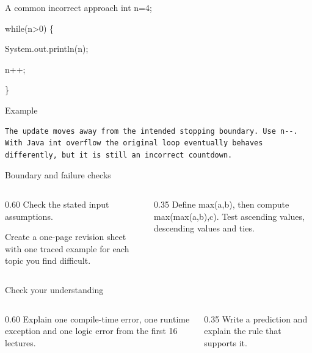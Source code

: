 \documentclass[10pt,aspectratio=169]{beamer}
\begin{document}
\begin{frame}[fragile,t]{A common incorrect approach}
int n=4;\par while(n\textgreater{}0) \{\par   System.out.println(n);\par   n++;\par \}
\vspace{1mm}\begin{block}{Example}
\begin{lstlisting}
The update moves away from the intended stopping boundary. Use n--. With Java int overflow the original loop eventually behaves differently, but it is still an incorrect countdown.
\end{lstlisting}
\end{block}
\end{frame}

\begin{frame}[fragile,t]{Boundary and failure checks}
\begin{columns}[T,onlytextwidth]\begin{column}{0.60\textwidth}
Check the stated input assumptions.

Create a one-page revision sheet with one traced example for each topic you find difficult.
\end{column}\begin{column}{0.35\textwidth}\small
Define max(a,b), then compute max(max(a,b),c). Test ascending values, descending values and ties.
\end{column}\end{columns}
\end{frame}

\begin{frame}[fragile,t]{Check your understanding}
\begin{columns}[T,onlytextwidth]\begin{column}{0.60\textwidth}
Explain one compile-time error, one runtime exception and one logic error from the first 16 lectures.
\end{column}\begin{column}{0.35\textwidth}\small
Write a prediction and explain the rule that supports it.
\end{column}\end{columns}
\end{frame}
\end{document}
